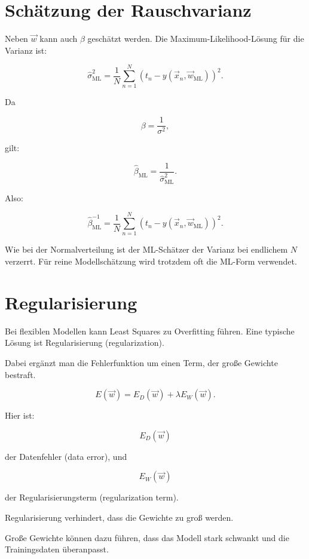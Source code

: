 \section{Schätzung der Rauschvarianz}

Neben \(\vec{w}\) kann auch \(\beta\) geschätzt werden.
Die Maximum-Likelihood-Lösung für die Varianz ist:

\[
    \hat{\sigma}^2_{\mathrm{ML}}
    =
    \frac{1}{N}
    \sum_{n=1}^{N}
    \left(
        t_n-y(\vec{x}_n,\vec{w}_{\mathrm{ML}})
    \right)^2.
\]

Da

\[
    \beta = \frac{1}{\sigma^2},
\]

gilt:

\[
    \hat{\beta}_{\mathrm{ML}}
    =
    \frac{1}{\hat{\sigma}^2_{\mathrm{ML}}}.
\]

Also:

\[
    \hat{\beta}_{\mathrm{ML}}^{-1}
    =
    \frac{1}{N}
    \sum_{n=1}^{N}
    \left(
        t_n-y(\vec{x}_n,\vec{w}_{\mathrm{ML}})
    \right)^2.
\]

\begin{notebox}
Wie bei der Normalverteilung ist der ML-Schätzer der Varianz bei endlichem \(N\) verzerrt.
Für reine Modellschätzung wird trotzdem oft die ML-Form verwendet.
\end{notebox}

\section{Regularisierung}

Bei flexiblen Modellen kann Least Squares zu Overfitting führen.
Eine typische Lösung ist Regularisierung (regularization).

Dabei ergänzt man die Fehlerfunktion um einen Term, der große Gewichte bestraft.

\[
    E(\vec{w})
    =
    E_D(\vec{w})
    +
    \lambda E_W(\vec{w}).
\]

Hier ist:

\[
    E_D(\vec{w})
\]

der Datenfehler (data error), und

\[
    E_W(\vec{w})
\]

der Regularisierungsterm (regularization term).

\begin{conceptbox}
Regularisierung verhindert, dass die Gewichte zu groß werden.

Große Gewichte können dazu führen, dass das Modell stark schwankt und die Trainingsdaten überanpasst.
\end{conceptbox}

